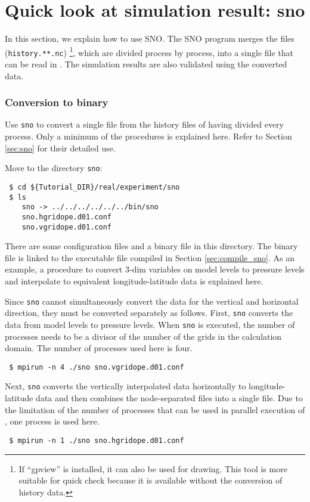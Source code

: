 \section{Quick look at simulation result: sno} \label{sec:quicklook}

In this section, we explain how to use SNO.
The SNO program merges the \netcdf files (\verb|history.**.nc|)
\footnote{If ``gpview'' is installed, it can also be used for drawing.
This tool is more suitable for quick check  because it is available without the conversion of history data.},
which are divided process by process, into a single \netcdf file that can be read in \grads.
The simulation results are also validated using the converted \netcdf data.

\subsubsection{Conversion to \grads binary}
Use \verb|sno| to convert a single \netcdf file from the history files of \netcdf having divided every process.
Only a minimum of the procedures is explained here. Refer to Section \ref{sec:sno} for their detailed use.

Move to the directory \verb|sno|:
\begin{verbatim}
 $ cd ${Tutorial_DIR}/real/experiment/sno
 $ ls
    sno -> ../../../../../../bin/sno
    sno.hgridope.d01.conf
    sno.vgridope.d01.conf
\end{verbatim}
There are some configuration files and a binary file in this directory.
The binary file is linked to the executable file compiled in Section \ref{sec:compile_sno}.
As an example, a procedure to convert 3-dim variables on model levels to pressure levels and interpolate to equivalent longitude-latitude data is explained here.
 
Since \verb|sno| cannot simultaneously convert the data for the vertical and horizontal direction,
they must be converted separately as follows.
First, \verb|sno| converts the data from model levels to pressure levels.
When \verb|sno| is executed, the number of processes needs to be a divisor of the number of the grids in the calculation domain. 
The number of processes used here is four.
\begin{verbatim}
 $ mpirun -n 4 ./sno sno.vgridope.d01.conf
\end{verbatim}
Next, \verb|sno| converts the vertically interpolated data horizontally to longitude-latitude data and then combines the node-separated {\netcdf} files into a single file.
Due to the limitation of the number of processes that can be used in parallel execution of {\sno}, one process is used here.
\begin{verbatim}
 $ mpirun -n 1 ./sno sno.hgridope.d01.conf
\end{verbatim}

